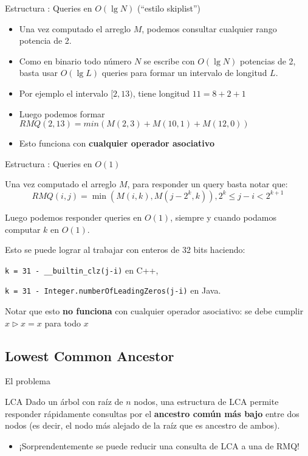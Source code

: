 \documentclass{beamer}
\DeclareMathOperator*{\mimin}{min}
\begin{document}
\begin{frame}{Estructura : Queries en $O(\lg N)$ (``estilo skiplist'')}
\begin{itemize}
      \item Una vez computado el arreglo $M$, podemos consultar cualquier rango potencia de 2.
      \item Como en binario todo número $N$ se escribe con $O(\lg N)$ potencias de 2, basta usar $O(\lg L)$ queries para formar un intervalo de longitud $L$.
      \item Por ejemplo el intervalo $[2,13)$, tiene longitud $11 = 8 + 2 + 1$
      \item Luego podemos formar $RMQ(2,13) = min(M(2,3) + M(10, 1) + M(12, 0))$
      \item Esto funciona con \textbf{cualquier operador asociativo}
    \end{itemize}
\end{frame}


\begin{frame}{Estructura : Queries en $O(1)$}
\begin{itemize}
      \item Una vez computado el arreglo $M$, para responder un query basta notar que:
      $$RMQ(i,j) = \mimin(M(i,k), M(j-2^k, k)), 2^k \leq j-i < 2^{k+1}$$
      \item Luego podemos responder queries en $O(1)$, siempre y cuando podamos computar $k$ en $O(1)$.
      {
        \item Esto se puede lograr al trabajar con enteros de 32 bits haciendo:
        \item \texttt{k = 31 - \_\_builtin\_clz(j-i)} en C++,
        \item \texttt{k = 31 - Integer.numberOfLeadingZeros(j-i)} en Java.
        \item Notar que esto \textbf{no funciona} con cualquier operador asociativo: se debe cumplir $x \triangleright x = x$ para todo $x$
      }
    \end{itemize}
\end{frame}

\subsection{Lowest Common Ancestor} %

\begin{frame}{El problema}
   \begin{block}{LCA}
      Dado un árbol con raíz de $n$ nodos, una estructura de LCA permite responder rápidamente consultas por el \textbf{ancestro común
      más bajo} entre dos nodos (es decir, el nodo más alejado de la raíz que es ancestro de ambos).
  \end{block}
  \begin{itemize}
      \item ¡Sorprendentemente se puede reducir una consulta de LCA a una de RMQ!
  \end{itemize}
\end{frame}
\end{document}
